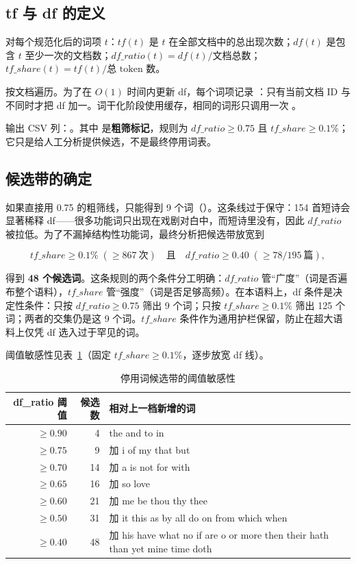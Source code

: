 \subsection{tf 与 df 的定义}

对每个规范化后的词项 $t$：$tf(t)$ 是 $t$ 在全部文档中的总出现次数；$df(t)$ 是包含 $t$ 至少一次的文档数；$df\_ratio(t)=df(t)/\text{文档总数}$；$tf\_share(t)=tf(t)/\text{总 token 数}$。

 按文档遍历。为了在 $O(1)$ 时间内更新 df，每个词项记录 ：只有当前文档 ID 与  不同时才把 df 加一。词干化阶段使用缓存，相同的词形只调用一次 。

 输出 CSV 列：。其中  是\textbf{粗筛标记}，规则为 $df\_ratio \ge 0.75$ 且 $tf\_share \ge 0.1\%$；它只是给人工分析提供候选，不是最终停用词表。

\subsection{候选带的确定}

如果直接用 0.75 的粗筛线，只能得到 9 个词（）。这条线过于保守：154 首短诗会显著稀释 df——很多功能词只出现在戏剧对白中，而短诗里没有，因此 $df\_ratio$ 被拉低。为了不漏掉结构性功能词，最终分析把候选带放宽到

\[
  tf\_share \ge 0.1\% \;(\ge 867\ \text{次})
  \quad\text{且}\quad
  df\_ratio \ge 0.40 \;(\ge 78/195\ \text{篇}),
\]

得到 \textbf{48 个候选词}。这条规则的两个条件分工明确：$df\_ratio$ 管“广度”（词是否遍布整个语料），$tf\_share$ 管“强度”（词是否足够高频）。在本语料上，df 条件是决定性条件：只按 $df\_ratio \ge 0.75$ 筛出 9 个词；只按 $tf\_share \ge 0.1\%$ 筛出 125 个词；两者的交集仍是这 9 个词。$tf\_share$ 条件作为通用护栏保留，防止在超大语料上仅凭 df 选入过于罕见的词。

阈值敏感性见表~\ref{tab:candidate-sensitivity}（固定 $tf\_share \ge 0.1\%$，逐步放宽 df 线）。

\begin{table}[htbp]
  \centering
  \caption{停用词候选带的阈值敏感性}
  \label{tab:candidate-sensitivity}
  \small
  \begin{tabularx}{\linewidth}{@{}r r X@{}}
    \toprule
    df\_ratio 阈值 & 候选数 & 相对上一档新增的词 \\
    \midrule
    $\ge 0.90$ & 4  & the and to in \\
    $\ge 0.75$ & 9  & 加 i of my that but \\
    $\ge 0.70$ & 14 & 加 a is not for with \\
    $\ge 0.65$ & 16 & 加 so love \\
    $\ge 0.60$ & 21 & 加 me be thou thy thee \\
    $\ge 0.50$ & 31 & 加 it this as by all do on from which when \\
    $\ge 0.40$ & 48 & 加 his have what no if are o or more then their hath than yet mine time doth \\
    \bottomrule
  \end{tabularx}
\end{table}

